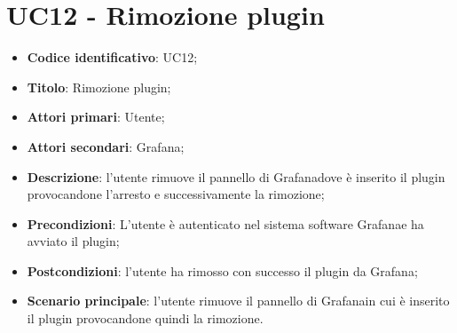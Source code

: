 \section{UC12 - Rimozione plugin}
\begin{itemize}
    \item \textbf{Codice identificativo}: UC12;
    \item \textbf{Titolo}: Rimozione plugin;
    \item \textbf{Attori primari}: Utente;
    \item \textbf{Attori secondari}: Grafana\glo;
    \item \textbf{Descrizione}: l'utente rimuove il pannello di Grafana\glosp dove è inserito il plugin provocandone l'arresto e successivamente la rimozione;
    \item \textbf{Precondizioni}: L'utente è autenticato nel sistema software Grafana\glosp e ha avviato il plugin;
    \item \textbf{Postcondizioni}: l'utente ha rimosso con successo il plugin da Grafana\glo;
    \item \textbf{Scenario principale}: l'utente rimuove il pannello di Grafana\glosp in cui è inserito il plugin provocandone quindi la rimozione.
\end{itemize}